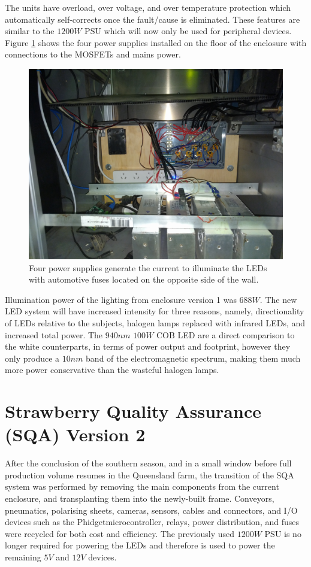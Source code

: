 \documentclass[fleqn,twoside,12pt]{report}
\begin{document}
The units have overload, over voltage, and over temperature protection which automatically self-corrects once the fault/cause is eliminated. These features are similar to the $1200W$ PSU which will now only be used for peripheral devices. Figure \ref{fig:mosfet_power_supply} shows the four power supplies installed on the floor of the enclosure with connections to the MOSFETs and mains power.

\begin{figure}[h]
	\centering
	\includegraphics[width=.5\linewidth]{mosfet_power_supply.jpg}
	\caption{Four power supplies generate the current to illuminate the LEDs with automotive fuses located on the opposite side of the wall.}
	\label{fig:mosfet_power_supply}
\end{figure}%


Illumination power of the lighting from enclosure version 1 was $688W$. The new LED system will have increased intensity for three reasons, namely, directionality of LEDs relative to the subjects, halogen lamps replaced with infrared LEDs, and increased total power. The $940nm$ $100W$ COB LED are a direct comparison to the white counterparts, in terms of power output and footprint, however they only produce a $10nm$ band of the electromagnetic spectrum, making them much more power conservative than the wasteful halogen lamps. 



\section{Strawberry Quality Assurance (SQA) Version 2}

After the conclusion of the southern season, and in a small window before full production volume resumes in the Queensland farm, the transition of the SQA system was performed by removing the main components from the current enclosure, and transplanting them into the newly-built frame. Conveyors, pneumatics, polarising sheets, cameras, sensors, cables and connectors, and I/O devices such as the Phidget\texttrademark microcontroller, relays, power distribution, and fuses were recycled for both cost and efficiency. The previously used $1200W$ PSU is no longer required for powering the LEDs and therefore is used to power the remaining $5V$ and $12V$ devices.
\end{document}
